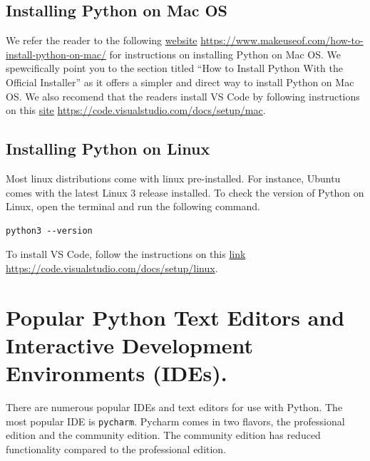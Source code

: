\documentclass[
  letterpaper,
  DIV=11,
  numbers=noendperiod]{scrreprt}
\begin{document}
\hypertarget{installing-python-on-mac-os}{%
\subsection{Installing Python on Mac
OS}\label{installing-python-on-mac-os}}

We refer the reader to the following
\href{https://www.makeuseof.com/how-to-install-python-on-mac/}{website}
\url{https://www.makeuseof.com/how-to-install-python-on-mac/} for
instructions on installing Python on Mac OS. We spewcifically point you
to the section titled ``How to Install Python With the Official
Installer'' as it offers a simpler and direct way to install Python on
Mac OS. We also recomend that the readers install VS Code by following
instructions on this
\href{https://code.visualstudio.com/docs/setup/mac}{site}
\url{https://code.visualstudio.com/docs/setup/mac}.

\hypertarget{installing-python-on-linux}{%
\subsection{Installing Python on
Linux}\label{installing-python-on-linux}}

Most linux distributions come with linux pre-installed. For instance,
Ubuntu comes with the latest Linux 3 release installed. To check the
version of Python on Linux, open the terminal and run the following
command.

\begin{verbatim}
python3 --version
\end{verbatim}

To install VS Code, follow the instructions on this
\href{https://code.visualstudio.com/docs/setup/linux}{link}
\url{https://code.visualstudio.com/docs/setup/linux}.

\hypertarget{popular-python-text-editors-and-interactive-development-environments-ides.}{%
\section{Popular Python Text Editors and Interactive Development
Environments
(IDEs).}\label{popular-python-text-editors-and-interactive-development-environments-ides.}}

There are numerous popular IDEs and text editors for use with Python.
The most popular IDE is \texttt{pycharm}. Pycharm comes in two flavors,
the professional edition and the community edition. The community
edition has reduced functionality compared to the professional edition.
\end{document}
